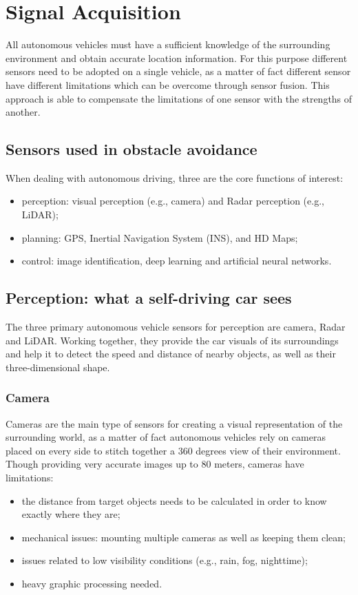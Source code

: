 \section{Signal Acquisition} 
\label{chap:SignalAcquisition}
All autonomous vehicles must have a sufficient knowledge of the surrounding environment and obtain accurate location information. For this purpose different sensors need to be adopted on a single vehicle, as a matter of fact different sensor have different limitations which can be overcome through sensor fusion. This approach is able to compensate the limitations of one sensor with the strengths of another.
\subsection{Sensors used in obstacle avoidance}
When dealing with autonomous driving, three are the core functions of interest: 
\begin{itemize}
    \item perception: visual perception (e.g., camera) and Radar perception (e.g., LiDAR);
    \item planning: GPS, Inertial Navigation System (INS), and HD Maps;
    \item control: image identification, deep learning and artificial neural networks.
\end{itemize}

\subsection{Perception: what a self-driving car sees}
The three primary autonomous vehicle sensors for perception are camera, Radar and LiDAR. Working together, they provide the car visuals of its surroundings and help it to detect the speed and distance of nearby objects, as well as their three-dimensional shape. \cite{NVIDIA}

\subsubsection{Camera} 
Cameras are the main type of sensors for creating a visual representation of the surrounding world, as a matter of fact autonomous vehicles rely on cameras placed on every side to stitch together a 360 degrees view of their environment.
Though providing very accurate images up to 80 meters, cameras have limitations:
\begin{itemize}
    \item the distance from target objects needs to be calculated in order to know exactly where they are;
    \item mechanical issues: mounting multiple cameras as well as keeping them clean;
    \item issues related to low visibility conditions (e.g., rain, fog, nighttime);
    \item heavy graphic processing needed.
\end{itemize}

